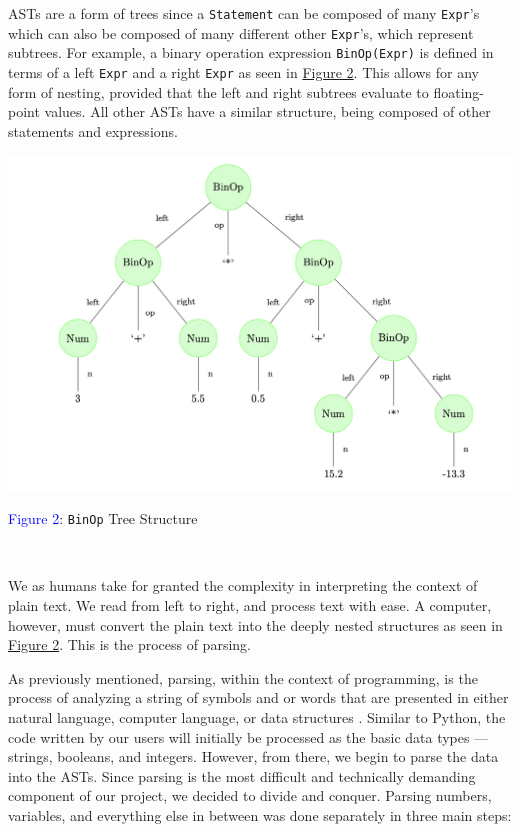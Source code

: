 \documentclass[fontsize=11pt]{article}
\begin{document}
ASTs are a form of trees since a \texttt{Statement} can be composed of many \texttt{Expr}'s which can also be composed of many different other \texttt{Expr}'s, which represent subtrees. For example, a binary operation expression \texttt{BinOp(Expr)} is defined in terms of a left \texttt{Expr} and a right \texttt{Expr} as seen in \hyperlink{fig2}{Figure 2}. This allows for any form of nesting, provided that the left and right subtrees evaluate to  floating-point values. All other ASTs have a similar structure, being composed of other statements and expressions.



\begin{center}
    \hypertarget{fig2}{}

    \includegraphics[scale=0.4]{binop2.png}
    
    \small{\textcolor{blue}{Figure 2}: \texttt{BinOp} Tree Structure}
    
    $ $
\end{center}

We as humans take for granted the complexity in interpreting the context of plain text. We read from left to right, and process text with ease. A computer, however, must convert the plain text into the deeply nested structures as seen in \hyperlink{fig2}{Figure 2}. This is the process of parsing. 

As previously mentioned, parsing, within the context of programming, is the process of analyzing a string of symbols and or words that are presented in either natural language, computer language, or data structures \cite{def}. Similar to Python, the code written by our users will initially be processed as the basic data types --- strings, booleans, and integers. However, from there, we begin to parse the data into the ASTs. Since parsing is the most difficult and technically demanding component of our project, we decided to divide and conquer. Parsing numbers, variables, and everything else in between was done separately in three main steps:
\end{document}
